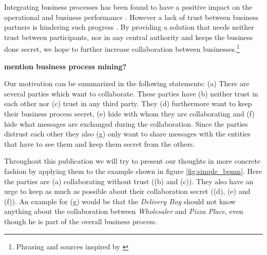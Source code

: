 \documentclass[runningheads]{llncs}
\newcommand{\comment}[1]{}
\newcommand{\ber}[1]{(\lowercase\expandafter{#1\relax})} %
\begin{document}
Integrating business processes has been found to have a positive impact on the operational and business performance \cite{flynn2010impact,narayanan2011antecedents}. However a lack of trust between business partners is hindering such progress \cite{panayides2009impact}. By providing a solution that needs neither trust between participants, nor in any central authority and keeps the business done secret, we hope to further increase collaboration between businesses.\footnote{Phrasing and sources inspired by \cite{weber2016untrusted}}

\textbf{mention business process mining?} \cite{van2007business}



Our motivation can be summarized in the following statements: \ber{a} There are several parties which want to collaborate. These parties have \ber{b} neither trust in each other nor \ber{c} trust in any third party. They \ber{d} furthermore want to keep their business process secret, \ber{e} hide with whom they are collaborating and \ber{f} hide what messages are exchanged during the collaboration. Since the parties distrust each other they also \ber{g} only want to share messages with the entities that have to see them and keep them secret from the others.

\comment{
\begin{itemize}
    \item there are several parties who want to collaborate 
    \item parties have no trust in each other 
    \item parties have no trust in a third party
    \item parties have strong interest in keeping things secret
\end{itemize}
}


Throughout this publication we will try to present our thoughts in more concrete fashion by applying them to the example shown in figure \ref{fig:simple_bpmn}. Here the parties are \ber{a} collaborating without trust (\ber{b} and \ber{c}). They also have an urge to keep as much as possible about their collaboration secret (\ber{d}, \ber{e} and \ber{f}). An example for \ber{g} would be that the \textit{Delivery Boy} should not know anything about the collaboration between \textit{Wholesaler} and \textit{Pizza Place}, even though he is part of the overall business process. 

\comment{
It displays the process of ordering, making and delivering pizza. In the process the \textit{Pizza Place} can decide weather to deliver straight away, using the \textit{Delivery Boy} as a middle man, or if it has order ingredients at the \textit{Wholesaler}. We chose a choreography diagram to display the process in order to emphasis the collaboration between the participants. Please keep in mind that in reality business processes might be much more complex and may involve many more participants. The example is kept simple on purpose and only serves as an illustration for our approach. 
}
\end{document}
